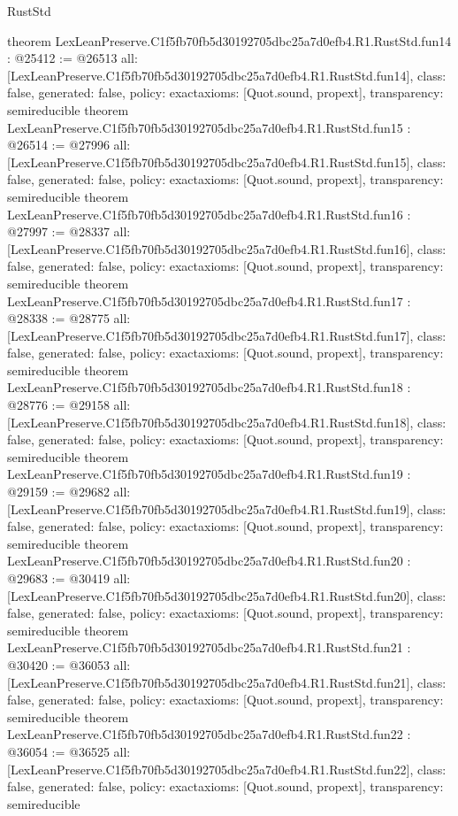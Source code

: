 \begin{lexlean}{RustStd}
\begin{coremodule}
{}
theorem LexLeanPreserve.C1f5fb70fb5d30192705dbc25a7d0efb4.R1.RustStd.fun14 : @25412 := @26513 {
  all: [LexLeanPreserve.C1f5fb70fb5d30192705dbc25a7d0efb4.R1.RustStd.fun14],
  class: false,
  generated: false,
  policy: exact{axioms: [Quot.sound, propext]},
  transparency: semireducible
}
theorem LexLeanPreserve.C1f5fb70fb5d30192705dbc25a7d0efb4.R1.RustStd.fun15 : @26514 := @27996 {
  all: [LexLeanPreserve.C1f5fb70fb5d30192705dbc25a7d0efb4.R1.RustStd.fun15],
  class: false,
  generated: false,
  policy: exact{axioms: [Quot.sound, propext]},
  transparency: semireducible
}
theorem LexLeanPreserve.C1f5fb70fb5d30192705dbc25a7d0efb4.R1.RustStd.fun16 : @27997 := @28337 {
  all: [LexLeanPreserve.C1f5fb70fb5d30192705dbc25a7d0efb4.R1.RustStd.fun16],
  class: false,
  generated: false,
  policy: exact{axioms: [Quot.sound, propext]},
  transparency: semireducible
}
theorem LexLeanPreserve.C1f5fb70fb5d30192705dbc25a7d0efb4.R1.RustStd.fun17 : @28338 := @28775 {
  all: [LexLeanPreserve.C1f5fb70fb5d30192705dbc25a7d0efb4.R1.RustStd.fun17],
  class: false,
  generated: false,
  policy: exact{axioms: [Quot.sound, propext]},
  transparency: semireducible
}
theorem LexLeanPreserve.C1f5fb70fb5d30192705dbc25a7d0efb4.R1.RustStd.fun18 : @28776 := @29158 {
  all: [LexLeanPreserve.C1f5fb70fb5d30192705dbc25a7d0efb4.R1.RustStd.fun18],
  class: false,
  generated: false,
  policy: exact{axioms: [Quot.sound, propext]},
  transparency: semireducible
}
theorem LexLeanPreserve.C1f5fb70fb5d30192705dbc25a7d0efb4.R1.RustStd.fun19 : @29159 := @29682 {
  all: [LexLeanPreserve.C1f5fb70fb5d30192705dbc25a7d0efb4.R1.RustStd.fun19],
  class: false,
  generated: false,
  policy: exact{axioms: [Quot.sound, propext]},
  transparency: semireducible
}
theorem LexLeanPreserve.C1f5fb70fb5d30192705dbc25a7d0efb4.R1.RustStd.fun20 : @29683 := @30419 {
  all: [LexLeanPreserve.C1f5fb70fb5d30192705dbc25a7d0efb4.R1.RustStd.fun20],
  class: false,
  generated: false,
  policy: exact{axioms: [Quot.sound, propext]},
  transparency: semireducible
}
theorem LexLeanPreserve.C1f5fb70fb5d30192705dbc25a7d0efb4.R1.RustStd.fun21 : @30420 := @36053 {
  all: [LexLeanPreserve.C1f5fb70fb5d30192705dbc25a7d0efb4.R1.RustStd.fun21],
  class: false,
  generated: false,
  policy: exact{axioms: [Quot.sound, propext]},
  transparency: semireducible
}
theorem LexLeanPreserve.C1f5fb70fb5d30192705dbc25a7d0efb4.R1.RustStd.fun22 : @36054 := @36525 {
  all: [LexLeanPreserve.C1f5fb70fb5d30192705dbc25a7d0efb4.R1.RustStd.fun22],
  class: false,
  generated: false,
  policy: exact{axioms: [Quot.sound, propext]},
  transparency: semireducible
}
\end{coremodule}
\end{lexlean}
